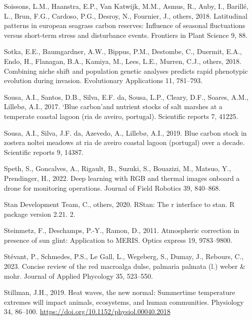 \documentclass[
  letterpaper,
  11pt,
  english,
  singlespacing,
  headsepline]{MastersDoctoralThesis}
\newlength{\cslhangindent}
\newenvironment{CSLReferences}[2] %
 {\begin{list}{}{%
  \setlength{\itemindent}{0pt}
  \setlength{\leftmargin}{0pt}
  \setlength{\parsep}{0pt}
  \ifodd #1
   \setlength{\leftmargin}{\cslhangindent}
   \setlength{\itemindent}{-1\cslhangindent}
  \fi
  \setlength{\itemsep}{#2\baselineskip}}}
 {\end{list}}
\begin{document}
\begin{CSLReferences}{1}{0}
Soissons, L.M., Haanstra, E.P., Van Katwijk, M.M., Asmus, R., Auby, I.,
Barillé, L., Brun, F.G., Cardoso, P.G., Desroy, N., Fournier, J.,
others, 2018. Latitudinal patterns in european seagrass carbon reserves:
Influence of seasonal fluctuations versus short-term stress and
disturbance events. Frontiers in Plant Science 9, 88.

Sotka, E.E., Baumgardner, A.W., Bippus, P.M., Destombe, C., Duermit,
E.A., Endo, H., Flanagan, B.A., Kamiya, M., Lees, L.E., Murren, C.J.,
others, 2018. Combining niche shift and population genetic analyses
predicts rapid phenotypic evolution during invasion. Evolutionary
Applications 11, 781--793.

Sousa, A.I., Santos, D.B., Silva, E.F. da, Sousa, L.P., Cleary, D.F.,
Soares, A.M., Lillebø, A.I., 2017. `Blue carbon'and nutrient stocks of
salt marshes at a temperate coastal lagoon (ria de aveiro, portugal).
Scientific reports 7, 41225.

Sousa, A.I., Silva, J.F. da, Azevedo, A., Lillebø, A.I., 2019. Blue
carbon stock in zostera noltei meadows at ria de aveiro coastal lagoon
(portugal) over a decade. Scientific reports 9, 14387.

Speth, S., Goncalves, A., Rigault, B., Suzuki, S., Bouazizi, M., Matsuo,
Y., Prendinger, H., 2022. Deep learning with RGB and thermal images
onboard a drone for monitoring operations. Journal of Field Robotics 39,
840--868.

Stan Development Team, C., others, 2020. RStan: The r interface to stan.
R package version 2.21. 2.

Steinmetz, F., Deschamps, P.-Y., Ramon, D., 2011. Atmospheric correction
in presence of sun glint: Application to MERIS. Optics express 19,
9783--9800.

Stévant, P., Schmedes, P.S., Le Gall, L., Wegeberg, S., Dumay, J.,
Rebours, C., 2023. Concise review of the red macroalga dulse, palmaria
palmata (l.) weber \& mohr. Journal of Applied Phycology 35, 523--550.

Stillman, J.H., 2019. Heat waves, the new normal: Summertime temperature
extremes will impact animals, ecosystems, and human communities.
Physiology 34, 86--100. \url{https://doi.org/10.1152/physiol.00040.2018}


\end{CSLReferences}
\end{document}
